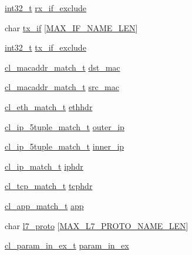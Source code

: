 \begin{DoxyCompactItemize}
\hyperlink{commondefs_8h_a32f2e37ee053cf2ce8ca28d1f74630e5}{int32\-\_\-t} \hyperlink{structcl__match__filter__t_aadf5eab7cdde955d01c44945629d8137}{rx\-\_\-if\-\_\-exclude}
\item 
char \hyperlink{structcl__match__filter__t_a9301f7b0a961e65e0dd20ff9dd430288}{tx\-\_\-if} \mbox{[}\hyperlink{group__FAPI__QOS__GENERAL_ga53a5c7c867e818bc8b6dea3105a90f62}{M\-A\-X\-\_\-\-I\-F\-\_\-\-N\-A\-M\-E\-\_\-\-L\-E\-N}\mbox{]}
\item 
\hyperlink{commondefs_8h_a32f2e37ee053cf2ce8ca28d1f74630e5}{int32\-\_\-t} \hyperlink{structcl__match__filter__t_a38f3b37d5e0e8e7a6e4d8a38a91a4d30}{tx\-\_\-if\-\_\-exclude}
\item 
\hyperlink{structcl__macaddr__match__t}{cl\-\_\-macaddr\-\_\-match\-\_\-t} \hyperlink{structcl__match__filter__t_ad4fd6c5bb8a5e61910b1542677c86b98}{dst\-\_\-mac}
\item 
\hyperlink{structcl__macaddr__match__t}{cl\-\_\-macaddr\-\_\-match\-\_\-t} \hyperlink{structcl__match__filter__t_ac4b0153044c639dc1e4baea491f30636}{src\-\_\-mac}
\item 
\hyperlink{structcl__eth__match__t}{cl\-\_\-eth\-\_\-match\-\_\-t} \hyperlink{structcl__match__filter__t_a5ae577cb62beb21526852c690c114daf}{ethhdr}
\item 
\hyperlink{structcl__ip__5tuple__match__t}{cl\-\_\-ip\-\_\-5tuple\-\_\-match\-\_\-t} \hyperlink{structcl__match__filter__t_a346a191513fe31bcadd310ffa61a6ec3}{outer\-\_\-ip}
\item 
\hyperlink{structcl__ip__5tuple__match__t}{cl\-\_\-ip\-\_\-5tuple\-\_\-match\-\_\-t} \hyperlink{structcl__match__filter__t_a4c6b0da49677eba7fea7787b01ad0623}{inner\-\_\-ip}
\item 
\hyperlink{structcl__ip__match__t}{cl\-\_\-ip\-\_\-match\-\_\-t} \hyperlink{structcl__match__filter__t_afcf3c38c71289d28a01fe1092010a2a2}{iphdr}
\item 
\hyperlink{structcl__tcp__match__t}{cl\-\_\-tcp\-\_\-match\-\_\-t} \hyperlink{structcl__match__filter__t_a67500b532d5be44ad701432e07d06f6f}{tcphdr}
\item 
\hyperlink{structcl__app__match__t}{cl\-\_\-app\-\_\-match\-\_\-t} \hyperlink{structcl__match__filter__t_ae968b9a6e2eaa31437509679e6c7c5c9}{app}
\item 
char \hyperlink{structcl__match__filter__t_ab5de4e65d81db7ec44acc42904e43d58}{l7\-\_\-proto} \mbox{[}\hyperlink{group__FAPI__QOS__GENERAL_ga2f3f659f8f6fbf01d76a03f42351e559}{M\-A\-X\-\_\-\-L7\-\_\-\-P\-R\-O\-T\-O\-\_\-\-N\-A\-M\-E\-\_\-\-L\-E\-N}\mbox{]}
\item 
\hyperlink{structcl__param__in__ex__t}{cl\-\_\-param\-\_\-in\-\_\-ex\-\_\-t} \hyperlink{structcl__match__filter__t_ac581a74dab7bf535f92e833056f01b0c}{param\-\_\-in\-\_\-ex}
\end{DoxyCompactItemize}


